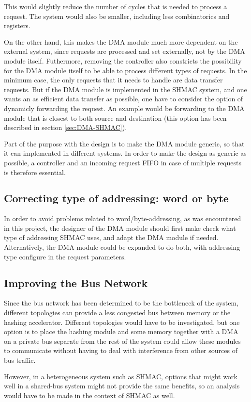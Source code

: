 This would slightly reduce the number of cycles that is needed to process a request.
The system would also be smaller, including less combinatorics and registers.

On the other hand, this makes the DMA module much more dependent on the external system, since requests are processed and set externally, not by the DMA module itself.
Futhermore, removing the controller also constricts the possibility for the DMA module itself to be able to process different types of requests.
In the minimum case, the only requests that it needs to handle are data transfer requests.
But if the DMA module is implemented in the SHMAC system, and one wants an as efficient data transfer as possible, one have to consider the option of dynamicly forwarding the request.
An example would be forwarding to the DMA module that is closest to both source and destination (this option has been described in section \ref{sec:DMA-SHMAC}).

Part of the purpose with the design is to make the DMA module generic, so that it can implemented in different systems.
In order to make the design as generic as possible, a controller and an incoming request FIFO
in case of multiple requests is therefore essential.

\subsection{Correcting type of addressing: word or byte}
In order to avoid problems related to word/byte-addressing, as was encountered in this project, the designer of the DMA module should first make check what type of addressing SHMAC uses, and adapt the DMA module if needed. 
Alternatively, the DMA module could be expanded to do both, with addressing type configure in the request parameters.

\subsection{Improving the Bus Network}
Since the bus network has been determined to be the bottleneck of the system, different topologies
can provide a less congested bus between memory or the hashing accelerator. Different topologies
would have to be investigated, but one option is to place the hashing module and some memory together
with a DMA on a private bus separate from the rest of the system could allow these modules to
communicate without having to deal with interference from other sources of bus traffic.

However, in a heterogeneous system such as SHMAC, options that might work well in a shared-bus
system might not provide the same benefits, so an analysis would have to be made in the context
of SHMAC as well.

